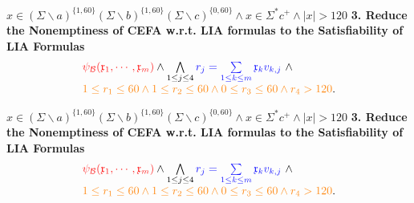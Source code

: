 \documentclass[landscape]{beamer}
\newcommand{\cB}{\mathcal{B}}
\newcommand{\anivar}{\mathfrak{x}}
\begin{document}
\begin{frame}{$ x\in (\Sigma \backslash a)^{\{1,60\}}(\Sigma \backslash b)^{\{1,60\}}(\Sigma \backslash c)^{\{0,60\}} \wedge x\in \Sigma^*c^+ \wedge |x| > 120$}
  \textbf{3. Reduce the Nonemptiness of CEFA w.r.t. LIA formulas to the Satisfiability of LIA Formulas}
  \begin{equation*}\label{eqn-LIA}
    \begin{array}{l}
      \textcolor{red!90}{\psi_\cB(\anivar_1, \cdots, \anivar_m)} \wedge \bigwedge \limits_{1 \le j \le 4} \textcolor{blue!90}{ r_j = \sum \limits_{1\le k \le m}  \anivar_k v_{k, j}}\ \wedge \\
      \textcolor{orange!90}{1 \le r_1 \le 60 \wedge 1 \le r_2 \le 60 \wedge 0 \le r_3 \le 60 \wedge r_4 > 120}.
    \end{array}
  \end{equation*}
\end{frame}
\begin{frame}{$ x\in (\Sigma \backslash a)^{\{1,60\}}(\Sigma \backslash b)^{\{1,60\}}(\Sigma \backslash c)^{\{0,60\}} \wedge x\in \Sigma^*c^+ \wedge |x| > 120$}
  \textbf{3. Reduce the Nonemptiness of CEFA w.r.t. LIA formulas to the Satisfiability of LIA Formulas}
  \begin{equation*}\label{eqn-LIA}
    \begin{array}{l}
      \textcolor{red!90}{\psi_\cB(\anivar_1, \cdots, \anivar_m)} \wedge \bigwedge \limits_{1 \le j \le 4} \textcolor{blue!90}{ r_j = \sum \limits_{1\le k \le m}  \anivar_k v_{k, j}}\ \wedge \\
      \textcolor{orange!90}{1 \le r_1 \le 60 \wedge 1 \le r_2 \le 60 \wedge 0 \le r_3 \le 60 \wedge r_4 > 120}.
    \end{array}
  \end{equation*}
\end{frame}
\end{document}
